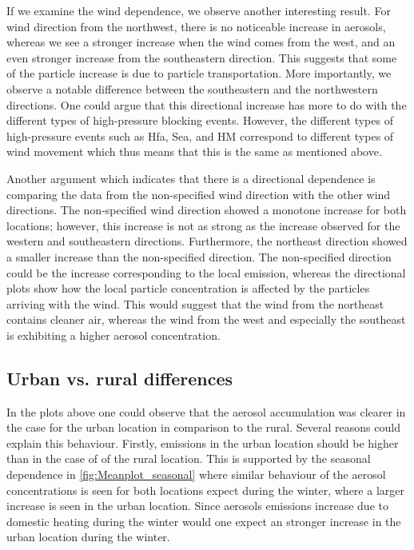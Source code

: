 If we examine the wind dependence, we observe another interesting result. For wind direction from the northwest, there is no noticeable increase in aerosols, whereas we see a stronger increase when the wind comes from the west, and an even stronger increase from the southeastern direction. This suggests that some of the particle increase is due to particle transportation. More importantly, we observe a notable difference between the southeastern and the northwestern directions. One could argue that this directional increase has more to do with the different types of high-pressure blocking events. However, the different types of high-pressure events such as Hfa, Sea, and HM correspond to different types of wind movement which thus means that this is the same as mentioned above. 

Another argument which indicates that there is a directional dependence is comparing the data from the non-specified wind direction with the other wind directions. The non-specified wind direction showed a monotone increase for both locations; however, this increase is not as strong as the increase observed for the western and southeastern directions. Furthermore, the northeast direction showed a smaller increase than the non-specified direction. The non-specified direction could be the increase corresponding to the local emission, whereas the directional plots show how the local particle concentration is affected by the particles arriving with the wind. This would suggest that the wind from the northeast contains cleaner air, whereas the wind from the west and especially the southeast is exhibiting a higher aerosol concentration. 

\subsection{Urban vs. rural differences}
In the plots above one could observe that the aerosol accumulation was clearer in the case for the urban location in comparison to the rural. Several reasons could explain this behaviour. Firstly, emissions in the urban location  should be higher than in the case of of the rural location. This is supported by the seasonal dependence in \autoref{fig:Meanplot_seasonal} where similar behaviour of the aerosol concentrations is seen for both locations expect during the winter, where a larger increase is seen in the urban location. Since aerosols emissions increase due to domestic heating during the winter would one expect an stronger increase in the urban location during the winter. 

